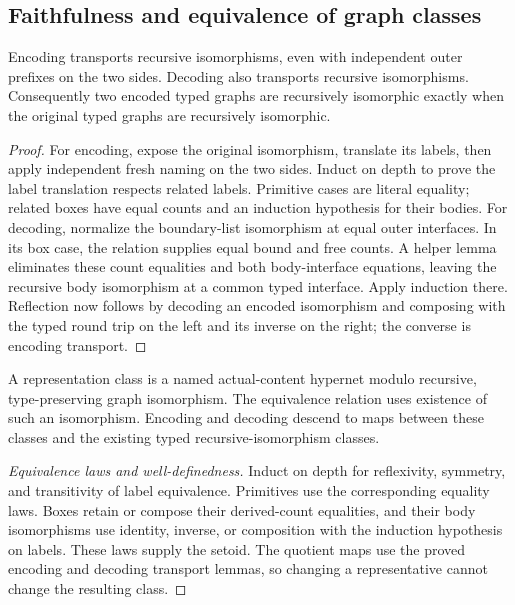 \subsection{Faithfulness and equivalence of graph classes}
\begin{theorem}
Encoding transports recursive isomorphisms, even with independent outer
prefixes on the two sides. Decoding also transports recursive isomorphisms.
Consequently two encoded typed graphs are recursively isomorphic exactly when
the original typed graphs are recursively isomorphic.
\end{theorem}
\begin{proof}
For encoding, expose the original isomorphism, translate its labels, then apply
independent fresh naming on the two sides. Induct on depth to prove the label
translation respects related labels. Primitive cases are literal equality;
related boxes have equal counts and an induction hypothesis for their bodies.
For decoding, normalize the boundary-list isomorphism at equal outer interfaces.
In its box case, the relation supplies equal bound and free counts. A helper
lemma eliminates these count equalities and both body-interface equations,
leaving the recursive body isomorphism at a common typed interface. Apply
induction there. Reflection now follows by decoding an encoded isomorphism
and composing with the typed round trip on the left and its inverse on the
right; the converse is encoding transport.
\end{proof}



\begin{definition}
A representation class is a named actual-content hypernet modulo recursive,
type-preserving graph isomorphism. The equivalence relation uses existence of
such an isomorphism. Encoding and decoding descend to maps between these
classes and the existing typed recursive-isomorphism classes.
\end{definition}
\begin{proof}[Equivalence laws and well-definedness]
Induct on depth for reflexivity, symmetry, and transitivity of label equivalence.
Primitives use the corresponding equality laws. Boxes retain or compose their
derived-count equalities, and their body isomorphisms use identity, inverse,
or composition with the induction hypothesis on labels. These laws supply
the setoid. The quotient maps use the proved encoding and decoding transport
lemmas, so changing a representative cannot change the resulting class.
\end{proof}

